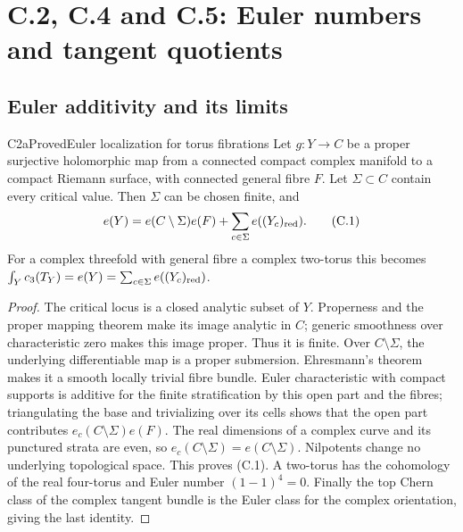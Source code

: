 \section{C.2, C.4 and C.5: Euler numbers and tangent quotients}

\subsection{Euler additivity and its limits}

\begin{statement}{C2a}{Proved}{Euler localization for torus fibrations}
Let $g:Y\to C$ be a proper surjective holomorphic map from a connected compact complex manifold to a compact Riemann surface, with connected general fibre $F$. Let $\Sigma\subset C$ contain every critical value. Then $\Sigma$ can be chosen finite, and
\[
 e(Y)=e(C\setminus\Sigma)e(F)+\sum_{c\in\Sigma}e((Y_c)_{\rm red}). \tag{C.1}
\]
For a complex threefold with general fibre a complex two-torus this becomes
$\int_Yc_3(T_Y)=e(Y)=\sum_{c\in\Sigma}e((Y_c)_{\rm red})$.
\end{statement}
\begin{proof}
The critical locus is a closed analytic subset of $Y$. Properness and the proper mapping theorem make its image analytic in $C$; generic smoothness over characteristic zero makes this image proper. Thus it is finite. Over $C\setminus\Sigma$, the underlying differentiable map is a proper submersion. Ehresmann's theorem makes it a smooth locally trivial fibre bundle. Euler characteristic with compact supports is additive for the finite stratification by this open part and the fibres; triangulating the base and trivializing over its cells shows that the open part contributes $e_c(C\setminus\Sigma)e(F)$. The real dimensions of a complex curve and its punctured strata are even, so $e_c(C\setminus\Sigma)=e(C\setminus\Sigma)$. Nilpotents change no underlying topological space. This proves (C.1). A two-torus has the cohomology of the real four-torus and Euler number $(1-1)^4=0$. Finally the top Chern class of the complex tangent bundle is the Euler class for the complex orientation, giving the last identity.
\end{proof}

